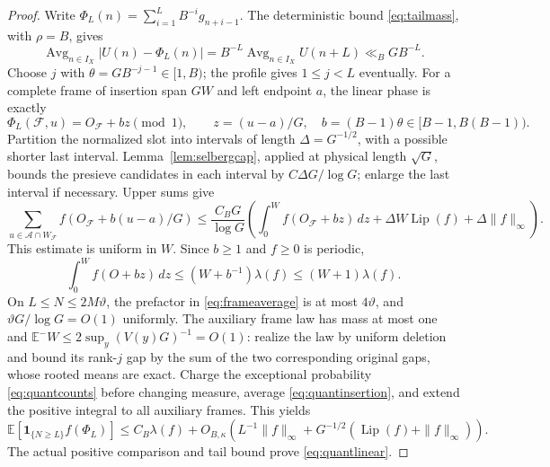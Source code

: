 \documentclass[11pt,a4paper]{article}
\newcommand{\E}{\mathbb E}
\newcommand{\ind}{\mathbf 1}
\DeclareMathOperator{\Avg}{Avg}
\begin{document}
\begin{proof}
Write $\Phi_L(n)=\sum_{i=1}^LB^{-i}g_{n+i-1}$.
The deterministic bound \eqref{eq:tailmass}, with $\rho=B$, gives
\[
 \Avg_{n\in I_X}|U(n)-\Phi_L(n)|
 =B^{-L}\Avg_{n\in I_X}U(n+L)\ll_B GB^{-L}.
\]
Choose $j$ with $\theta=GB^{-j-1}\in[1,B)$; the profile gives
$1\le j<L$ eventually. For a complete frame of insertion span $GW$
and left endpoint $a$, the linear phase is exactly
\[
 \Phi_L(\mathcal F,u)=O_{\mathcal F}+bz\pmod1,
 \qquad z=(u-a)/G,\quad b=(B-1)\theta\in[B-1,B(B-1)).
\]
Partition the normalized slot into intervals of length
$\Delta=G^{-1/2}$, with a possible shorter last interval.
Lemma~\ref{lem:selbergcap}, applied at physical length $\sqrt G$,
bounds the presieve candidates in each interval by $C\Delta G/\log G$;
enlarge the last interval if necessary. Upper sums give
\begin{equation}\label{eq:quantinsertion}
 \sum_{u\in\mathcal A\cap W_{\mathcal F}}
 f(O_{\mathcal F}+b(u-a)/G)
 \le\frac{C_BG}{\log G}\left(
 \int_0^W f(O_{\mathcal F}+bz)\,dz
 +\Delta W\operatorname{Lip}(f)+\Delta\|f\|_\infty\right).
\end{equation}
This estimate is uniform in $W$. Since $b\ge1$ and $f\ge0$ is periodic,
\[
 \int_0^W f(O+bz)\,dz\le(W+b^{-1})\lambda(f)
                                \le(W+1)\lambda(f).
\]
On $L\le N\le2M\vartheta$, the prefactor in
\eqref{eq:frameaverage} is at most $4\vartheta$, and
$\vartheta G/\log G=O(1)$ uniformly. The auxiliary frame law has mass
at most one and $\E^-W\le2\sup_y(V(y)G)^{-1}=O(1)$: realize the law
by uniform deletion and bound its rank-$j$ gap by the sum of the two
corresponding original gaps, whose rooted means are exact.
Charge the exceptional probability \eqref{eq:quantcounts} before changing
measure, average \eqref{eq:quantinsertion}, and extend the positive
integral to all auxiliary frames. This yields
\[
 \E[\ind_{\{N\ge L\}}f(\Phi_L)]\le C_B\lambda(f)+
 O_{B,\kappa}\!\left(L^{-1}\|f\|_\infty
        +G^{-1/2}(\operatorname{Lip}(f)+\|f\|_\infty)\right).
\]
The actual positive comparison and tail bound prove \eqref{eq:quantlinear}.
\end{proof}
\end{document}
